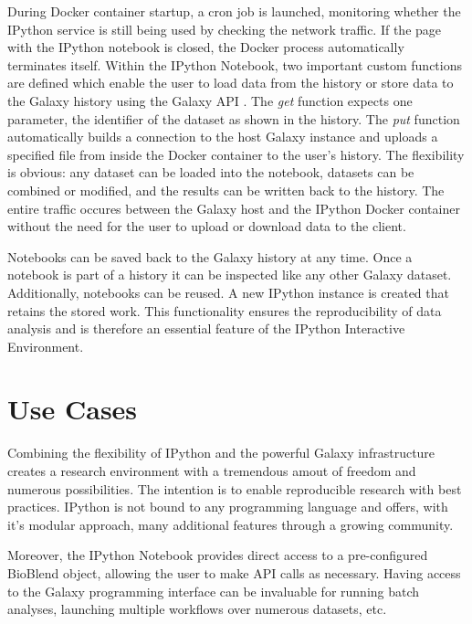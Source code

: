 \documentclass{bioinfo}
\begin{document}
\begin{methods}
During Docker container startup, a cron job is launched, monitoring whether the IPython service
is still being used by checking the network traffic. If the page with the IPython notebook is closed, the
Docker process automatically terminates itself. Within the IPython Notebook, 
two important custom functions are defined which enable the
user to load data from the history or store data to the Galaxy history using the Galaxy API \citep{Sloggett2013}.
The \textit{get} function expects one parameter, the identifier of the dataset as shown in the history.
The \textit{put} function automatically builds a connection to the host
Galaxy instance and uploads a specified file from inside the Docker container to the user's
history. The flexibility is obvious: any dataset can be
loaded into the notebook, datasets can be combined or modified, and the results can be written back to the history.
The entire traffic occures between the Galaxy host and the IPython Docker container without the need for the user to upload or download data to the client.

Notebooks can be saved back to the Galaxy history at any time. Once a notebook is part of a history 
it can be inspected like any other Galaxy dataset. 
Additionally, notebooks can be reused. A new IPython instance is created that retains the stored work. 
This functionality ensures the reproducibility of data analysis and is therefore an essential
feature of the IPython Interactive Environment.


\section{Use Cases}
Combining the flexibility of IPython and the powerful Galaxy infrastructure creates a research environment
with a tremendous amout of freedom and numerous possibilities. The intention is to enable
reproducible research with best practices. IPython is not bound to any programming language 
and offers, with it's modular approach, many additional features through a growing community.

Moreover, the IPython Notebook provides direct access to a pre-configured
BioBlend object, allowing the user to make API calls as necessary. Having access to the Galaxy programming interface
can be invaluable for running batch analyses, launching multiple workflows over numerous datasets, etc. 


\end{methods}
\end{document}
